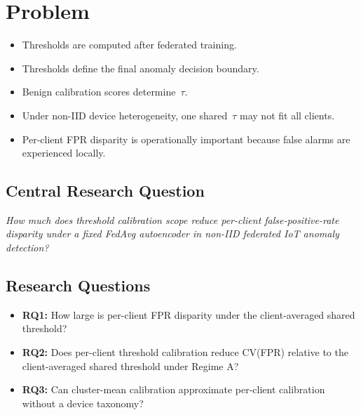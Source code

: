 
\section{Problem}

\begin{itemize}
  \item Thresholds are computed after federated training.
  \item Thresholds define the final anomaly decision boundary.
  \item Benign calibration scores determine~$\tau$.
  \item Under non-IID device heterogeneity, one shared~$\tau$ may not fit all clients.
  \item Per-client FPR disparity is operationally important because false alarms are experienced locally.
\end{itemize}

\subsection{Central Research Question}

\begin{tcolorbox}[callout]
\itshape
How much does threshold calibration scope reduce per-client false-positive-rate disparity
under a fixed FedAvg autoencoder in non-IID federated IoT anomaly detection?
\end{tcolorbox}

\subsection{Research Questions}

\begin{itemize}
  \item \textbf{RQ1:} How large is per-client FPR disparity under the client-averaged shared threshold?
  \item \textbf{RQ2:} Does per-client threshold calibration reduce CV(FPR) relative to the
    client-averaged shared threshold under Regime A?
  \item \textbf{RQ3:} Can cluster-mean calibration approximate per-client calibration
    without a device taxonomy?
\end{itemize}

